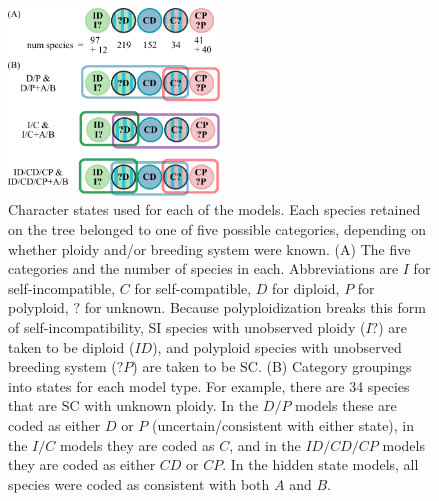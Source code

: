 \begin{figure}
\centering
\includegraphics[width=0.5\textwidth]{states} %
\caption{
Character states used for each of the models.
Each species retained on the tree belonged to one of five possible categories, depending on whether ploidy and/or breeding system were known.
(A) The five categories and the number of species in each.
Abbreviations are $I$ for self-incompatible, $C$ for self-compatible, $D$ for diploid, $P$ for polyploid, $?$ for unknown.
Because polyploidization breaks this form of self-incompatibility, SI species with unobserved ploidy ($I?$) are taken to be diploid ($ID$), and polyploid species with unobserved breeding system ($?P$) are taken to be SC.
(B) Category groupings into states for each model type.
For example, there are 34 species that are SC with unknown ploidy. %
In the $D/P$ models these are coded as either $D$ or $P$ (uncertain/consistent with either state), in the $I/C$ models they are coded as $C$, and in the $ID/CD/CP$ models they are coded as either $CD$ or $CP$.
In the hidden state models, all species were coded as consistent with both $A$ and $B$.
}
\label{figure:stateclassifications}
\end{figure}

\begin{suppfigure}
    \caption{ All models.  [This figure is provided as a separate, large-format page.] }
    \label{fig:allmodels}
\end{suppfigure}



